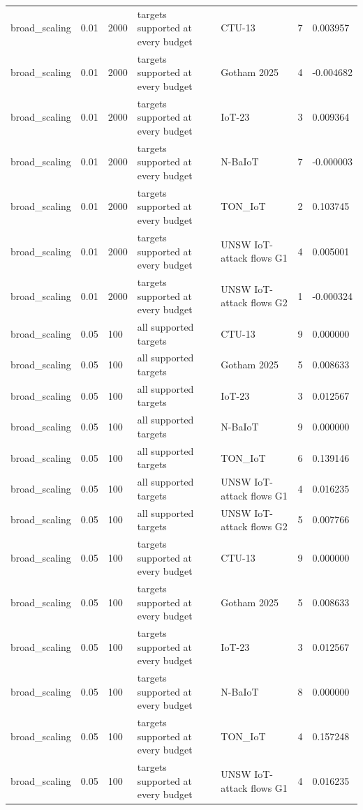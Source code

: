 \begin{tabular}{lllllll}
broad\_scaling & 0.01 & 2000 & targets supported at every budget & CTU-13 & 7 & 0.003957 \\
broad\_scaling & 0.01 & 2000 & targets supported at every budget & Gotham 2025 & 4 & -0.004682 \\
broad\_scaling & 0.01 & 2000 & targets supported at every budget & IoT-23 & 3 & 0.009364 \\
broad\_scaling & 0.01 & 2000 & targets supported at every budget & N-BaIoT & 7 & -0.000003 \\
broad\_scaling & 0.01 & 2000 & targets supported at every budget & TON\_IoT & 2 & 0.103745 \\
broad\_scaling & 0.01 & 2000 & targets supported at every budget & UNSW IoT-attack flows G1 & 4 & 0.005001 \\
broad\_scaling & 0.01 & 2000 & targets supported at every budget & UNSW IoT-attack flows G2 & 1 & -0.000324 \\
broad\_scaling & 0.05 & 100 & all supported targets & CTU-13 & 9 & 0.000000 \\
broad\_scaling & 0.05 & 100 & all supported targets & Gotham 2025 & 5 & 0.008633 \\
broad\_scaling & 0.05 & 100 & all supported targets & IoT-23 & 3 & 0.012567 \\
broad\_scaling & 0.05 & 100 & all supported targets & N-BaIoT & 9 & 0.000000 \\
broad\_scaling & 0.05 & 100 & all supported targets & TON\_IoT & 6 & 0.139146 \\
broad\_scaling & 0.05 & 100 & all supported targets & UNSW IoT-attack flows G1 & 4 & 0.016235 \\
broad\_scaling & 0.05 & 100 & all supported targets & UNSW IoT-attack flows G2 & 5 & 0.007766 \\
broad\_scaling & 0.05 & 100 & targets supported at every budget & CTU-13 & 9 & 0.000000 \\
broad\_scaling & 0.05 & 100 & targets supported at every budget & Gotham 2025 & 5 & 0.008633 \\
broad\_scaling & 0.05 & 100 & targets supported at every budget & IoT-23 & 3 & 0.012567 \\
broad\_scaling & 0.05 & 100 & targets supported at every budget & N-BaIoT & 8 & 0.000000 \\
broad\_scaling & 0.05 & 100 & targets supported at every budget & TON\_IoT & 4 & 0.157248 \\
broad\_scaling & 0.05 & 100 & targets supported at every budget & UNSW IoT-attack flows G1 & 4 & 0.016235 \\

\end{tabular}
